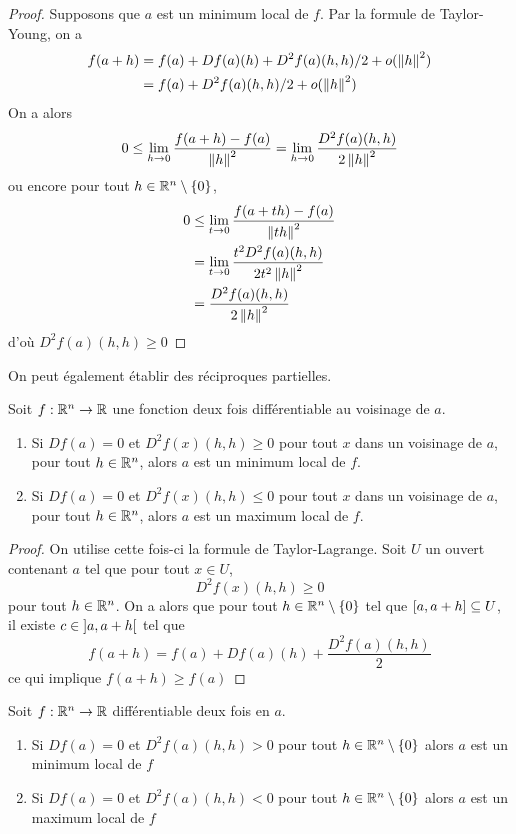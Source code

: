 \begin{proof}
    Supposons que $a$ est un minimum local de $f$. Par la formule de Taylor-Young, on a
    \begin{align*}
        f(a+h) &= f(a) + Df(a)(h) + D^2f(a)(h,h)/2 + o(\left\| h \right\| ^2)\\
        &= f(a) + D^2f(a)(h,h)/2 + o(\left\| h \right\| ^2)
    \end{align*}
    On a alors $$
    0\le \lim_{h\to0}\frac{f(a+h)-f(a)}{\left\| h \right\|^2} = \lim_{h\to 0}\frac{D^2f(a)(h,h)}{2\left\| h \right\| ^2}$$ ou encore pour tout $h\in\mathbb{R}^n\setminus \{0\}$, 
    \begin{align*}
        0&\le \lim_{t\to0}\frac{f(a+th)-f(a)}{\left\| th \right\|^2}\\
        &= \lim_{t\to 0}\frac{t^2D^2f(a)(h,h)}{2t^2\left\| h \right\| ^2}\\
        &=\frac{D^2f(a)(h,h)}{2\left\| h \right\| ^2}
    \end{align*}
    d'où $D^2f(a)(h,h)\ge 0$
\end{proof}
On peut également établir des réciproques partielles.
\begin{proposition}
    Soit $f:\mathbb{R}^n\to \mathbb{R}$ une fonction deux fois différentiable au voisinage de $a$.
    \begin{enumerate}
        \item Si $Df(a) = 0$ et $D^2f(x)(h,h)\ge 0$ pour tout $x$ dans un voisinage de $a$, pour tout $h\in\mathbb{R}^n$, alors $a$ est un minimum local de $f$.
        \item Si $Df(a) = 0$ et $D^2f(x)(h,h)\le 0$ pour tout $x$ dans un voisinage de $a$, pour tout $h\in\mathbb{R}^n$, alors $a$ est un maximum local de $f$.
    \end{enumerate}
\end{proposition}
\begin{proof}
    On utilise cette fois-ci la formule de Taylor-Lagrange. Soit $U$ un ouvert contenant $a$ tel que pour tout $x\in U$, $$D^2f(x)(h,h)\ge 0$$ pour tout $h\in\mathbb{R}^n$. On a alors que pour tout $h\in\mathbb{R}^n\setminus\{0\}$ tel que $\left[ a,a+h\right]\subseteq U$, il existe $c\in\left] a,a+h\right[$ tel que $$f(a+h) = f(a) + Df(a)(h) + \frac{D^2f(a)(h,h)}{2}$$ 
    ce qui implique $f(a+h) \ge f(a)$
\end{proof}
\begin{proposition}
    Soit $f:\mathbb{R}^n\to\mathbb{R}$ différentiable deux fois en $a$.
    \begin{enumerate}
        \item Si $Df(a) = 0$ et $D^2f(a)(h,h)>0$ pour tout $h\in\mathbb{R}^n\setminus\{0\}$ alors $a$ est un minimum local de $f$
        \item Si $Df(a) = 0$ et $D^2f(a)(h,h)<0$ pour tout $h\in\mathbb{R}^n\setminus\{0\}$ alors $a$ est un maximum local de $f$
    \end{enumerate}
\end{proposition}
